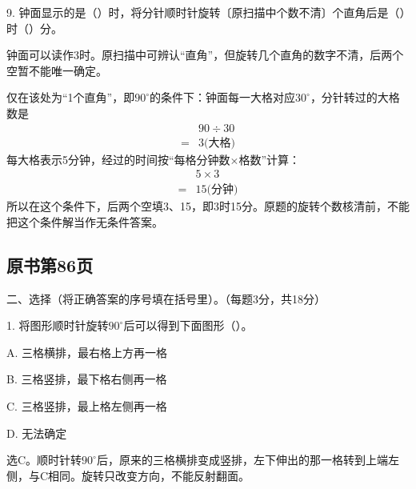 9. 钟面显示的是（\hspace{1.8em}）时，将分针顺时针旋转〔原扫描中个数不清〕个直角后是（\hspace{1.8em}）时（\hspace{1.8em}）分。\par
{}
\begin{BookAnswer}
钟面可以读作\(3\)时。原扫描中可辨认“直角”，但旋转几个直角的数字不清，后两个空暂不能唯一确定。\par 仅在该处为“1个直角”，即\(90^\circ\)的条件下：钟面每一大格对应\(30^\circ\)，分针转过的大格数是\[\begin{aligned}&90\div30\\={}&3\text{(大格)}\end{aligned}\]每大格表示5分钟，经过的时间按“每格分钟数\(\times\)格数”计算：\[\begin{aligned}&5\times3\\={}&15\text{(分钟)}\end{aligned}\]所以在这个条件下，后两个空填3、15，即3时15分。原题的旋转个数核清前，不能把这个条件解当作无条件答案。
\end{BookAnswer}



\subsection*{原书第86页}

二、选择（将正确答案的序号填在括号里）。（每题3分，共18分）\par 1. 将图形顺时针旋转\(90^\circ\)后可以得到下面图形（\hspace{1.8em}）。\par
\noindent A. 三格横排，最右格上方再一格\par
\noindent B. 三格竖排，最下格右侧再一格\par
\noindent C. 三格竖排，最上格左侧再一格\par
\noindent D. 无法确定\par
{}
\begin{BookAnswer}
选C。顺时针转\(90^\circ\)后，原来的三格横排变成竖排，左下伸出的那一格转到上端左侧，与C相同。旋转只改变方向，不能反射翻面。
\end{BookAnswer}

